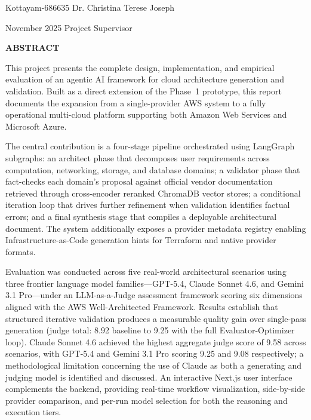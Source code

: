 \documentclass[12pt,a4wide]{report}
\theoremstyle{plain}
\theoremstyle{definition}
\theoremstyle{remark}
\begin{document}
\vspace{4cm}

\noindent Kottayam-686635  \hfill Dr. Christina Terese Joseph

\noindent November 2025 \hfill Project Supervisor

\clearpage






\begin{center}
{\Large{\bf{ABSTRACT}}}
\end{center}


This project presents the complete design, implementation, and empirical evaluation of an agentic AI framework for cloud architecture generation and validation. Built as a direct extension of the Phase~1 prototype, this report documents the expansion from a single-provider AWS system to a fully operational multi-cloud platform supporting both Amazon Web Services and Microsoft Azure.

The central contribution is a four-stage pipeline orchestrated using LangGraph subgraphs: an architect phase that decomposes user requirements across computation, networking, storage, and database domains; a validator phase that fact-checks each domain's proposal against official vendor documentation retrieved through cross-encoder reranked ChromaDB vector stores; a conditional iteration loop that drives further refinement when validation identifies factual errors; and a final synthesis stage that compiles a deployable architectural document. The system additionally exposes a provider metadata registry enabling Infrastructure-as-Code generation hints for Terraform and native provider formats.

Evaluation was conducted across five real-world architectural scenarios using three frontier language model families---GPT-5.4, Claude Sonnet 4.6, and Gemini 3.1 Pro---under an LLM-as-a-Judge assessment framework scoring six dimensions aligned with the AWS Well-Architected Framework. Results establish that structured iterative validation produces a measurable quality gain over single-pass generation (judge total: 8.92 baseline to 9.25 with the full Evaluator-Optimizer loop). Claude Sonnet 4.6 achieved the highest aggregate judge score of 9.58 across scenarios, with GPT-5.4 and Gemini 3.1 Pro scoring 9.25 and 9.08 respectively; a methodological limitation concerning the use of Claude as both a generating and judging model is identified and discussed. An interactive Next.js user interface complements the backend, providing real-time workflow visualization, side-by-side provider comparison, and per-run model selection for both the reasoning and execution tiers.
\end{document}
